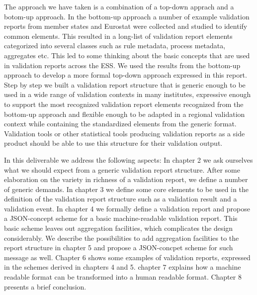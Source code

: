 The approach we have taken is a combination of a top-down apprach and a botom-up approach.
In the bottom-up approach a number of example validation reports from member states and Eurostat were collected and studied to identify common elements.
This resulted in a long-list of validation report elements categorized into several classes such as rule metadata, process metadata, aggregates etc.
This led to some thinking about the basic concepts that are used in validation reports across the ESS.
We used the results from the bottom-up approach to develop a more formal top-down approach expressed in this report.
Step by step we built a validation report structure that is generic enough to be used in a wide range of validation contexts in many institutes,
expressive enough to support the most recognized validation report elements recognized from the bottom-up approach and
flexible enough to be adapted in a regional validation context while containing the standardized elements from the generic format.
Validation tools or other statistical tools producing validation reports as a side product should be able to use this structure for their validation output.

In this deliverable we address the following aspects:
In chapter 2 we ask ourselves what we should expect from a generic validation report structure.
After some elaboration on the variety in richness of a validation report, we define a number of generic demands.
In chapter 3 we define some core elements to be used in the definition of the validation report structure such as a validation result and a validation event.
In chapter 4 we formally define a validation report and propose a JSON-concept scheme for a basic machine-readable validation report.
This basic scheme leaves out aggregation facilities, which complicates the design considerably.
We describe the possibilities to add aggregation facilities to the report structure in chapter 5 and propose a JSON-concpet scheme for such message as well.
Chapter 6 shows some examples of validation reports, expressed in the schemes derived in chapters 4 and 5.
chapter 7 explains how a machine readable format can be transformed into a human readable format.
Chapter 8 presents a brief conclusion.

